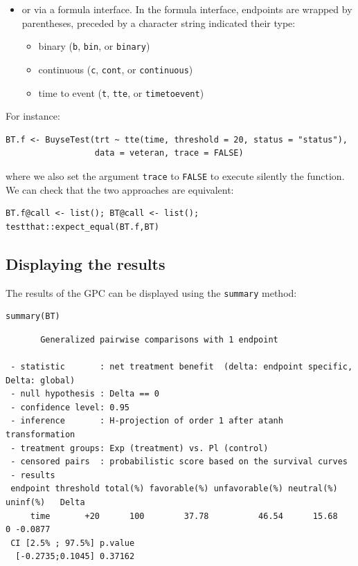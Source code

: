 \documentclass[12pt]{article}
\begin{document}
\clearpage

\begin{itemize}
\item or via a formula interface. In the formula interface, endpoints are
wrapped by parentheses, preceded by a character string indicated
their type:
\begin{itemize}[label={-}]
\item binary (\texttt{b}, \texttt{bin}, or \texttt{binary})
\item continuous (\texttt{c}, \texttt{cont}, or  \texttt{continuous})
\item time to event (\texttt{t}, \texttt{tte}, or \texttt{timetoevent})
\end{itemize}
\end{itemize}

For instance:
\lstset{language=r,label= ,caption= ,captionpos=b,numbers=none}
\begin{lstlisting}
BT.f <- BuyseTest(trt ~ tte(time, threshold = 20, status = "status"),
                  data = veteran, trace = FALSE)
\end{lstlisting}

where we also set the argument \texttt{trace} to \texttt{FALSE} to execute silently
the function. We can check that the two approaches are equivalent:
\lstset{language=r,label= ,caption= ,captionpos=b,numbers=none}
\begin{lstlisting}
BT.f@call <- list(); BT@call <- list();
testthat::expect_equal(BT.f,BT)
\end{lstlisting}

\subsection{Displaying the results}
\label{sec:org8f4bc55}

The results of the GPC can be displayed using the \texttt{summary} method:
\lstset{language=r,label= ,caption= ,captionpos=b,numbers=none}
\begin{lstlisting}
summary(BT)
\end{lstlisting}

\begin{verbatim}
       Generalized pairwise comparisons with 1 endpoint

 - statistic       : net treatment benefit  (delta: endpoint specific, Delta: global) 
 - null hypothesis : Delta == 0 
 - confidence level: 0.95 
 - inference       : H-projection of order 1 after atanh transformation 
 - treatment groups: Exp (treatment) vs. Pl (control) 
 - censored pairs  : probabilistic score based on the survival curves
 - results
 endpoint threshold total(%) favorable(%) unfavorable(%) neutral(%) uninf(%)   Delta
     time       +20      100        37.78          46.54      15.68        0 -0.0877
 CI [2.5% ; 97.5%] p.value 
  [-0.2735;0.1045] 0.37162
\end{verbatim}
\end{document}
